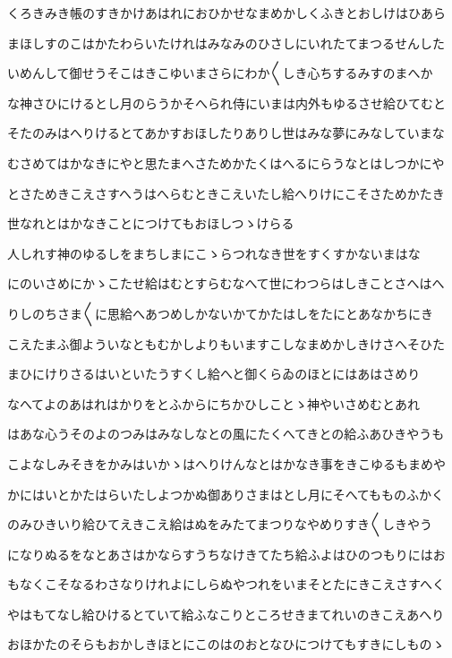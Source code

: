 \documentclass[a4paper,11pt,landscape]{ltjtarticle}
\begin{document}
くろきみき帳のすきかけあはれにおひかせなまめかしくふきとおしけはひあら
\par\medskip
まほしすのこはかたわらいたけれはみなみのひさしにいれたてまつるせんした
\par\medskip
いめんして御せうそこはきこゆいまさらにわか〱しき心ちするみすのまへか
\par\medskip
な神さひにけるとし月のらうかそへられ侍にいまは内外もゆるさせ給ひてむと
\par\medskip
そたのみはへりけるとてあかすおほしたりありし世はみな夢にみなしていまな
\par\medskip
むさめてはかなきにやと思たまへさためかたくはへるにらうなとはしつかにや
\par\medskip
とさためきこえさすへうはへらむときこえいたし給へりけにこそさためかたき
\par\medskip
世なれとはかなきことにつけてもおほしつゝけらる
\par\medskip
人しれす神のゆるしをまちしまにこゝらつれなき世をすくすかないまはな
\par\medskip
にのいさめにかゝこたせ給はむとすらむなへて世にわつらはしきことさへはへ
\par\medskip
りしのちさま〱に思給へあつめしかないかてかたはしをたにとあなかちにき
\par\medskip
こえたまふ御よういなともむかしよりもいますこしなまめかしきけさへそひた
\par\medskip
まひにけりさるはいといたうすくし給へと御くらゐのほとにはあはさめり
\par\medskip
なへてよのあはれはかりをとふからにちかひしことゝ神やいさめむとあれ
\par\medskip
はあな心うそのよのつみはみなしなとの風にたくへてきとの給ふあひきやうも
\par\medskip
こよなしみそきをかみはいかゝはへりけんなとはかなき事をきこゆるもまめや
\par\medskip
かにはいとかたはらいたしよつかぬ御ありさまはとし月にそへてもものふかく
\par\medskip
のみひきいり給ひてえきこえ給はぬをみたてまつりなやめりすき〱しきやう
\par\medskip
になりぬるをなとあさはかならすうちなけきてたち給ふよはひのつもりにはお
\par\medskip
もなくこそなるわさなりけれよにしらぬやつれをいまそとたにきこえさすへく
\par\medskip
やはもてなし給ひけるとていて給ふなこりところせきまてれいのきこえあへり
\par\medskip
おほかたのそらもおかしきほとにこのはのおとなひにつけてもすきにしものゝ
\end{document}
